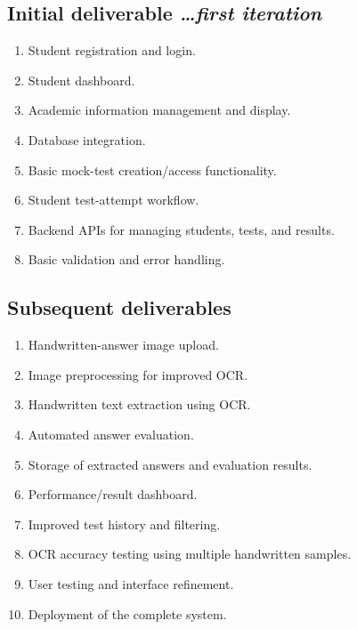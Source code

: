 \documentclass[11pt,a4paper]{article}
\newcommand{\BvrHint}[1]{%
  {\normalfont\normalsize\itshape\hfill #1}}
\begin{document}
\subsection{Initial deliverable %
\BvrHint{\ldots first iteration}}
\begin{enumerate}
    \item Student registration and login.

    \item Student dashboard.

    \item Academic information management and display.

    \item Database integration.

    \item Basic mock-test creation/access functionality.

    \item Student test-attempt workflow.

    \item Backend APIs for managing students, tests, and results.

    \item Basic validation and error handling.
\end{enumerate}

\subsection{Subsequent deliverables}
\begin{enumerate}
    \item Handwritten-answer image upload.

    \item Image preprocessing for improved OCR.

    \item Handwritten text extraction using OCR.

    \item Automated answer evaluation.

    \item Storage of extracted answers and evaluation results.

    \item Performance/result dashboard.

    \item Improved test history and filtering.

    \item OCR accuracy testing using multiple handwritten samples.

    \item User testing and interface refinement.

    \item Deployment of the complete system.
\end{enumerate}
\end{document}
